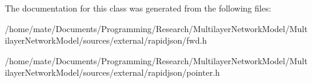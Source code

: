 The documentation for this class was generated from the following files\+:\begin{DoxyCompactItemize}
\item 
/home/mate/\+Documents/\+Programming/\+Research/\+Multilayer\+Network\+Model/\+Multilayer\+Network\+Model/sources/external/rapidjson/fwd.\+h\item 
/home/mate/\+Documents/\+Programming/\+Research/\+Multilayer\+Network\+Model/\+Multilayer\+Network\+Model/sources/external/rapidjson/pointer.\+h\end{DoxyCompactItemize}
